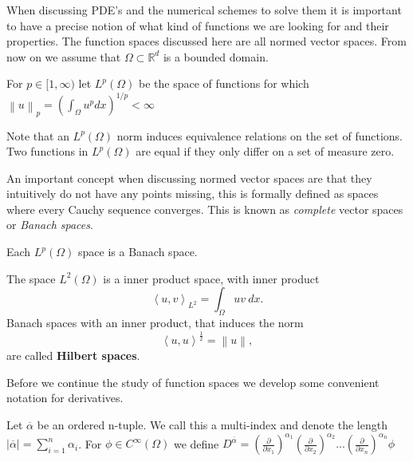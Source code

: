 \documentclass[../Main/main.tex]{subfiles}
\begin{document}
	When discussing PDE's and the numerical schemes to solve them it is important to have a precise notion of what kind of functions we are looking for and their properties. The function spaces discussed here are all normed vector spaces. From now on we assume that $\Omega \subset \mathbb{R}^d$ is a bounded domain.
	\begin{definition}
		For $p\in [1,\infty)$ let $L^p(\Omega)$ be the space of functions for which  $\left \| u \right \|_p = (\int_{\Omega} u^pdx)^{1/p} <\infty$
	\end{definition}

	\begin{remark}
		Note that an $L^p(\Omega)$ norm induces equivalence relations on the set of functions. Two functions in $L^p(\Omega)$ are equal if they only differ on a set of measure zero.
	\end{remark}
	An important concept when discussing normed vector spaces are that they intuitively do not have any points missing, this is formally defined as spaces where every Cauchy sequence converges. This is known as \emph{complete} vector spaces or \emph{Banach spaces}.
	
	\begin{theorem}\label{theorem:Riesz-Fischer}
		Each $L^p(\Omega)$ space is a Banach space.
	\end{theorem}
	\begin{remark}
		The space $L^2(\Omega)$ is a inner product space, with inner product
		\begin{equation*}
			\left \langle u,v\right \rangle_{L^2} = \int_{\Omega}uv \ dx.
		\end{equation*}
		 Banach spaces with an inner product, that induces the norm 
		\begin{equation*}
			\left \langle u,u \right \rangle ^{\frac{1}{2}} = \left \| u \right \|,
		\end{equation*}
		are called \textbf{Hilbert spaces}. 
	\end{remark}
	
	
	
	
	Before we continue the study of function spaces we develop some convenient notation for derivatives.
	
	\begin{definition}
		Let $\overline{\alpha}$ be an ordered n-tuple. We call this a multi-index and denote the length $|\overline{\alpha}| = \sum_{i=1}^n 		\alpha_i$.
		For $\phi \in C^{\infty}(\Omega)$ we define $D^{\overline{\alpha}} = (\frac{\partial }{\partial x_1})^{\alpha_1}(\frac{\partial }{\partial x_2})^{\alpha_2}...(\frac{\partial }{\partial x_n})^{\alpha_n}\phi$
	\end{definition}
	
\end{document}
